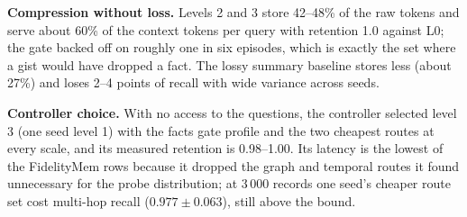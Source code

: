 \documentclass[journal]{IEEEtran}
\begin{document}
\begin{table}[t]
\caption{Recall@10 by record count ($K=10$, 3 seeds, word-vector embedder)}
\label{tab:synthetic}
\centering
\scriptsize
{}
\end{table}

\textbf{Compression without loss.} Levels 2 and 3 store 42--48\% of the raw tokens and serve about 60\% of the context tokens per query with retention 1.0 against L0; the gate backed off on roughly one in six episodes, which is exactly the set where a gist would have dropped a fact. The lossy summary baseline stores less (about 27\%) and loses 2--4 points of recall with wide variance across seeds.

\textbf{Controller choice.} With no access to the questions, the controller selected level 3 (one seed level 1) with the facts gate profile and the two cheapest routes at every scale, and its measured retention is 0.98--1.00. Its latency is the lowest of the FidelityMem rows because it dropped the graph and temporal routes it found unnecessary for the probe distribution; at 3\,000 records one seed's cheaper route set cost multi-hop recall ($0.977 \pm 0.063$), still above the bound.
\end{document}
